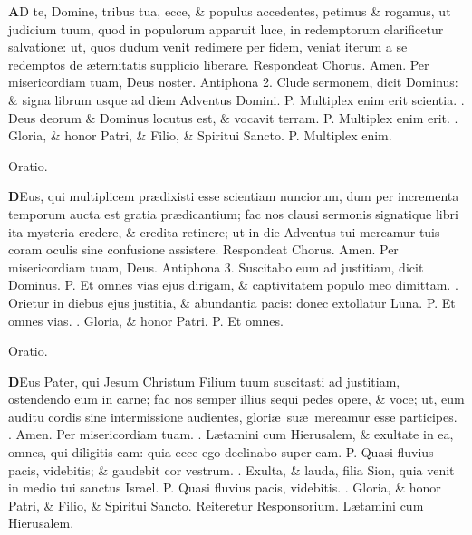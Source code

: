\documentclass[letter,11pt]{book}
\makeatletter
\DeclareRobustCommand{\Vbar}{\vers@resp{-0.1em}{V}}
\DeclareRobustCommand{\Rbar}{\vers@resp{0pt}{R}}
\newcommand{\vers@resp@sym}{\raisebox{0.2ex}{\rotatebox[origin=c]{-20}{$\m@th\rceil$}}}
\newcommand{\vers@resp}[2]{%
  {\ooalign{\hidewidth\kern#1\vers@resp@sym\hidewidth\cr#2\cr}}%
}%
\def\P{\color{Red} P. \color{black}}
\def\V{\color{Red} \Vbar . \color{black}}
\def\R{\color{Red} \Rbar . \color{black}}
\makeatother
\begin{document}
\begin{multicols}{2}
\lettrine[lines=2]{\bfseries \color{Red} A}{}D te, Domine, tribus tua, ecce, \& populus accedentes, petimus \& rogamus, ut judicium tuum, quod in populorum apparuit luce, in redemptorum clarificetur salvatione: ut, quos dudum venit redimere per fidem, veniat iterum a se redemptos de \ae ternitatis supplicio liberare. \color{Red} Respondeat Chorus. \color{black} Amen. Per misericordiam tuam, Deus noster.
\newline \color{Red} Antiphona 2. \color{black} Clude sermonem, dicit Dominus: \& signa librum usque ad diem Adventus Domini. \P Multiplex enim erit scientia. \V Deus deorum \& Dominus locutus est, \& vocavit terram. \P Multiplex enim erit. \V Gloria, \& honor Patri, \& Filio, \& Spiritui Sancto. \P Multiplex enim.
\vspace{-.5em} \begin{center} \color{Red} Oratio. \color{black} \end{center} \vspace{-.5em}
\lettrine[lines=2]{\bfseries \color{Red} D}{}Eus, qui multiplicem pr\ae dixisti esse scientiam nunciorum, dum per incrementa temporum aucta est gratia pr\ae dicantium; fac nos clausi sermonis signatique libri ita mysteria credere, \& credita retinere; ut in die Adventus tui mereamur tuis coram oculis sine confusione assistere. \color{Red} Respondeat Chorus. \color{black} Amen. Per misericordiam tuam, Deus.
\newline \color{Red} Antiphona 3. \color{black} Suscitabo eum ad justitiam, dicit Dominus. \P Et omnes vias ejus dirigam, \& captivitatem populo meo dimittam. \V Orietur in diebus ejus justitia, \& abundantia pacis: donec extollatur Luna. \P Et omnes vias. \V Gloria, \& honor Patri. \P Et omnes.
\vspace{-.5em} \begin{center} \color{Red} Oratio. \color{black} \end{center} \vspace{-.5em}
\lettrine[lines=2]{\bfseries \color{Red} D}{}Eus Pater, qui Jesum Christum Filium tuum suscitasti ad justitiam, ostendendo eum in carne; fac nos semper illius sequi pedes opere, \& voce; ut, eum auditu cordis sine intermissione audientes, glori\ae \ su\ae \ mereamur esse participes. \R Amen. Per misericordiam tuam.
\newline \R L\ae tamini cum Hierusalem, \& exultate in ea, omnes, qui diligitis eam: quia ecce ego declinabo super eam. \P Quasi fluvius pacis, videbitis; \& gaudebit cor vestrum. \V Exulta, \& lauda, filia Sion, quia venit in medio tui sanctus Israel. \P Quasi fluvius pacis, videbitis. \V Gloria, \& honor Patri, \& Filio, \& Spiritui Sancto. \color{Red} Reiteretur Responsorium. \color{black} L\ae tamini cum Hierusalem.

\end{multicols}
\end{document}
